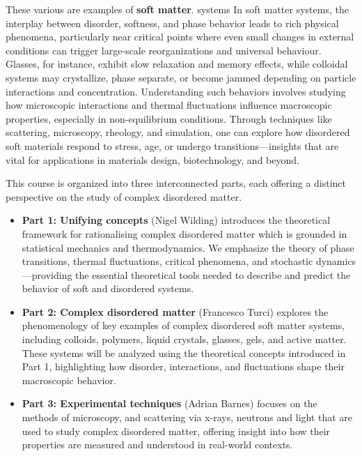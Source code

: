 \documentclass[
  letterpaper,
  enabledeprecatedfontcommands]{report}
\providecommand{\tightlist}{%
  \setlength{\itemsep}{0pt}\setlength{\parskip}{0pt}}
\begin{document}
These various are examples of \textbf{soft matter}. systems In soft
matter systems, the interplay between disorder, softness, and phase
behavior leads to rich physical phenomena, particularly near critical
points where even small changes in external conditions can trigger
large-scale reorganizations and universal behaviour. Glasses, for
instance, exhibit slow relaxation and memory effects, while colloidal
systems may crystallize, phase separate, or become jammed depending on
particle interactions and concentration. Understanding such behaviors
involves studying how microscopic interactions and thermal fluctuations
influence macroscopic properties, especially in non-equilibrium
conditions. Through techniques like scattering, microscopy, rheology,
and simulation, one can explore how disordered soft materials respond to
stress, age, or undergo transitions---insights that are vital for
applications in materials design, biotechnology, and beyond.

This course is organized into three interconnected parts, each offering
a distinct perspective on the study of complex disordered matter.

\begin{itemize}
\tightlist
\item
  \textbf{Part 1: Unifying concepts} (Nigel Wilding) introduces the
  theoretical framework for rationalising complex disordered matter
  which is grounded in statistical mechanics and thermodynamics. We
  emphasize the theory of phase transitions, thermal fluctuations,
  critical phenomena, and stochastic dynamics---providing the essential
  theoretical tools needed to describe and predict the behavior of soft
  and disordered systems.\\
\item
  \textbf{Part 2: Complex disordered matter} (Francesco Turci) explores
  the phenomenology of key examples of complex disordered soft matter
  systems, including colloids, polymers, liquid crystals, glasses, gels,
  and active matter. These systems will be analyzed using the
  theoretical concepts introduced in Part 1, highlighting how disorder,
  interactions, and fluctuations shape their macroscopic behavior.\\
\item
  \textbf{Part 3: Experimental techniques} (Adrian Barnes) focuses on
  the methods of microscopy, and scattering via x-rays, neutrons and
  light that are used to study complex disordered matter, offering
  insight into how their properties are measured and understood in
  real-world contexts.
\end{itemize}
\end{document}

